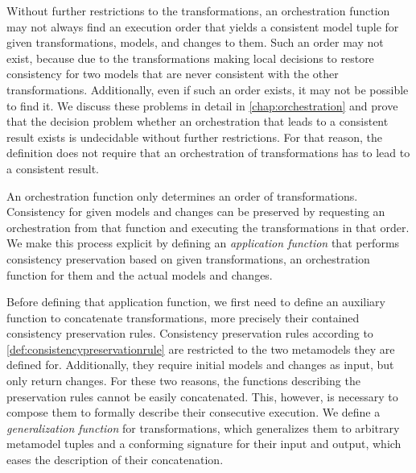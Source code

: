 Without further restrictions to the transformations, an orchestration function may not always find an execution order that yields a consistent model tuple for given transformations, models, and changes to them.
Such an order may not exist, because due to the transformations making local decisions to restore consistency for two models that are never consistent with the other transformations.
Additionally, even if such an order exists, it may not be possible to find it.
%
We discuss these problems in detail in \autoref{chap:orchestration} and prove that the decision problem whether an orchestration that leads to a consistent result exists is undecidable without further restrictions.
For that reason, the definition does not require that an orchestration of transformations has to lead to a consistent result.

An orchestration function only determines an order of transformations.
Consistency for given models and changes can be preserved by requesting an orchestration from that function and executing the transformations in that order.
We make this process explicit by defining an \emph{application function} that performs consistency preservation based on given transformations, an orchestration function for them and the actual models and changes.

Before defining that application function, we first need to define an auxiliary function to concatenate transformations, more precisely their contained consistency preservation rules.
Consistency preservation rules according to \autoref{def:consistencypreservationrule} are restricted to the two metamodels they are defined for.
Additionally, they require initial models and changes as input, but only return changes.
For these two reasons, the functions describing the preservation rules cannot be easily concatenated.
This, however, is necessary to compose them to formally describe their consecutive execution.
We define a \emph{generalization function} for transformations, which generalizes them to arbitrary metamodel tuples and a conforming signature for their input and output, which eases the description of their concatenation.

